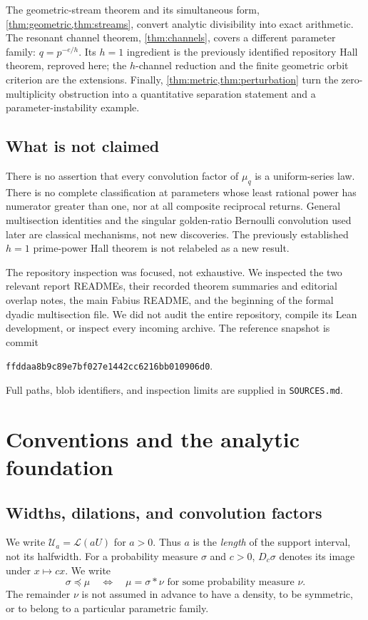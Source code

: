 \documentclass[11pt,letterpaper]{article}
\theoremstyle{definition}
\theoremstyle{remark}
\newcommand{\Law}{\mathcal L}
\newcommand{\Un}{\mathcal U}
\numberwithin{equation}{section}
\begin{document}
The geometric-stream theorem and its simultaneous form, \cref{thm:geometric,thm:streams}, convert analytic divisibility into exact arithmetic. The resonant channel theorem, \cref{thm:channels}, covers a different parameter family: $q=p^{-e/h}$. Its $h=1$ ingredient is the previously identified repository Hall theorem, reproved here; the $h$-channel reduction and the finite geometric orbit criterion are the extensions. Finally, \cref{thm:metric,thm:perturbation} turn the zero-multiplicity obstruction into a quantitative separation statement and a parameter-instability example.

\subsection{What is not claimed}
There is no assertion that every convolution factor of $\mu_q$ is a uniform-series law. There is no complete classification at parameters whose least rational power has numerator greater than one, nor at all composite reciprocal returns. General multisection identities and the singular golden-ratio Bernoulli convolution used later are classical mechanisms, not new discoveries. The previously established $h=1$ prime-power Hall theorem is not relabeled as a new result.

The repository inspection was focused, not exhaustive. We inspected the two relevant report READMEs, their recorded theorem summaries and editorial overlap notes, the main Fabius README, and the beginning of the formal dyadic multisection file. We did not audit the entire repository, compile its Lean development, or inspect every incoming archive. The reference snapshot is commit
\begin{center}\small\texttt{ffddaa8b9c89e7bf027e1442cc6216bb010906d0}.\end{center}
Full paths, blob identifiers, and inspection limits are supplied in \texttt{SOURCES.md}.

\section{Conventions and the analytic foundation}\label{sec:foundation}
\subsection{Widths, dilations, and convolution factors}
We write $\Un_a=\Law(aU)$ for $a>0$. Thus $a$ is the \emph{length} of the support interval, not its halfwidth. For a probability measure $\sigma$ and $c>0$, $D_c\sigma$ denotes its image under $x\mapsto cx$. We write
\[
 \sigma\preceq\mu\quad\Longleftrightarrow\quad
 \mu=\sigma*\nu\text{ for some probability measure }\nu.
\]
The remainder $\nu$ is not assumed in advance to have a density, to be symmetric, or to belong to a particular parametric family.
\end{document}
